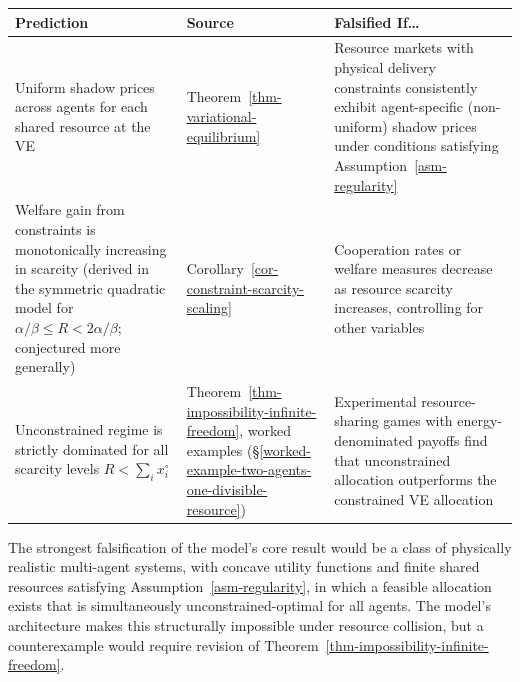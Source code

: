 \documentclass[11pt]{article}
\theoremstyle{plain}
\theoremstyle{definition}
\theoremstyle{remark}
\newcounter{none}
\begin{document}
{\def\LTcaptype{none} %
\begin{longtable}[]{@{}
  >{\raggedright\arraybackslash}p{}
  >{\raggedright\arraybackslash}p{}
  >{\raggedright\arraybackslash}p{}@{}}
\toprule\noalign{}
\begin{minipage}[b]{\linewidth}\raggedright
Prediction
\end{minipage} & \begin{minipage}[b]{\linewidth}\raggedright
Source
\end{minipage} & \begin{minipage}[b]{\linewidth}\raggedright
Falsified If\ldots{}
\end{minipage} \\
\midrule\noalign{}
\endhead
\bottomrule\noalign{}
\endlastfoot
Uniform shadow prices across agents for each shared resource at the VE &
Theorem~\ref{thm-variational-equilibrium} & Resource markets with
physical delivery constraints consistently exhibit agent-specific
(non-uniform) shadow prices under conditions satisfying
Assumption~\ref{asm-regularity} \\
Welfare gain from constraints is monotonically increasing in scarcity
(derived in the symmetric quadratic model for
\(\alpha/\beta \leq R < 2\alpha/\beta\); conjectured more generally) &
Corollary~\ref{cor-constraint-scarcity-scaling} & Cooperation rates or
welfare measures decrease as resource scarcity increases, controlling
for other variables \\
Unconstrained regime is strictly dominated for all scarcity levels
\(R < \sum_i x_i^{\circ}\) &
Theorem~\ref{thm-impossibility-infinite-freedom}, worked examples
(§\ref{worked-example-two-agents-one-divisible-resource}) & Experimental
resource-sharing games with energy-denominated payoffs find that
unconstrained allocation outperforms the constrained VE allocation \\
\end{longtable}
}

The strongest falsification of the model's core result would be a class
of physically realistic multi-agent systems, with concave utility
functions and finite shared resources satisfying
Assumption~\ref{asm-regularity}, in which a feasible allocation exists
that is simultaneously unconstrained-optimal for all agents. The model's
architecture makes this structurally impossible under resource
collision, but a counterexample would require revision of
Theorem~\ref{thm-impossibility-infinite-freedom}.
\end{document}

